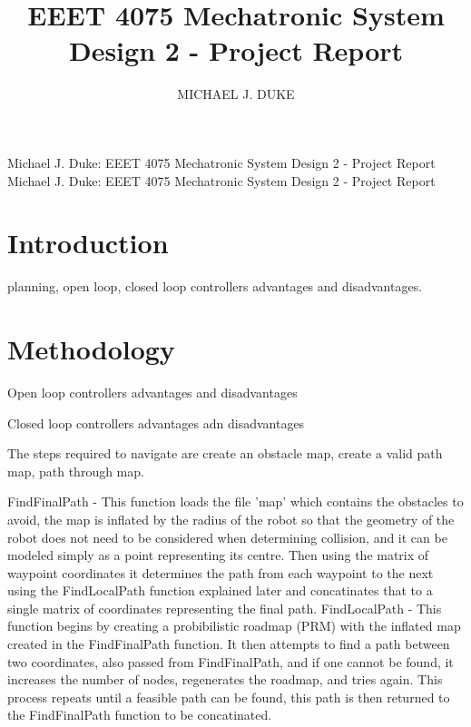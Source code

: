 \documentclass{ieeeaccess}
\begin{document}

\title{EEET 4075 Mechatronic System Design 2 - Project Report}
\author{\uppercase{Michael J. Duke}}
\address[1]{University of South Australia, Mawson Lakes, SA 5095 Australia (e-mail: dukmj002@mymail.unisa.edu.au)}

\markboth
{Michael J. Duke: EEET 4075 Mechatronic System Design 2 - Project Report}
{Michael J. Duke: EEET 4075 Mechatronic System Design 2 - Project Report}

\titlepgskip=-15pt

\maketitle

\section{Introduction}
\label{sec:introduction}
 planning, open loop, closed loop controllers advantages and disadvantages.\par

\section{Methodology}
\label{sec:meth}
Open loop controllers advantages and disadvantages\par
Closed loop controllers advantages adn disadvantages\par
The steps required to navigate are create an obstacle map, create a valid path map, path through map.\par
FindFinalPath - This function loads the file 'map' which contains the obstacles to avoid, the map is inflated by the radius of the robot so that the geometry of the robot does not need to be considered when determining collision, and it can be modeled simply as a point representing its centre. Then using the matrix of waypoint coordinates it determines the path from each waypoint to the next using the FindLocalPath function explained later and concatinates that to a single matrix of coordinates representing the final path.
FindLocalPath - This function begins by creating a probibilistic roadmap (PRM) with the inflated map created in the FindFinalPath function. It then attempts to find a path between two coordinates, also passed from FindFinalPath, and if one cannot be found, it increases the number of nodes, regenerates the roadmap, and tries again. This process repeats until a feasible path can be found, this path is then returned to the FindFinalPath function to be concatinated.
\end{document}
